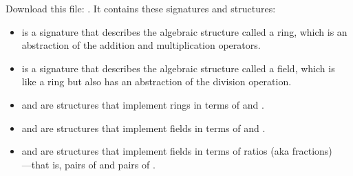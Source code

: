 Download this file: . It contains these signatures and structures:
\begin{itemize}
  \item {} is a signature that describes the algebraic structure called a ring, which is an abstraction of the addition and multiplication operators.
  \item {} is a signature that describes the algebraic structure called a field, which is like a ring but also has an abstraction of the division operation.
  \item {} and  are structures that implement rings in terms of  and .
  \item {} and  are structures that implement fields in terms of  and .
  \item {} and  are structures that implement fields in terms of ratios (aka fractions)\\---that is, pairs of  and pairs of .
\end{itemize}

